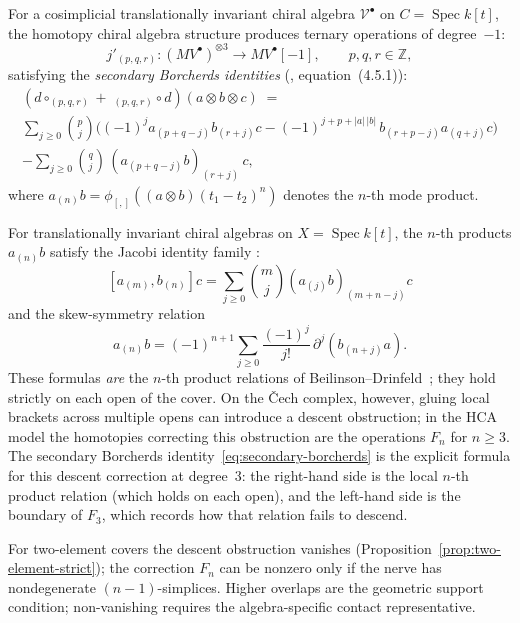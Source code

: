 \begin{definition}
\label{def:secondary-borcherds}
For a cosimplicial translationally invariant chiral algebra
$\mathcal{V}^\bullet$ on $C = \operatorname{Spec} k[t]$, the
homotopy chiral algebra structure produces ternary
operations of degree~$-1$:
\[
j'_{(p,q,r)}\colon
 (MV^\bullet)^{\otimes 3} \longrightarrow MV^\bullet[-1],
 \qquad p,q,r \in \mathbb{Z},
\]
satisfying the \emph{secondary Borcherds identities}
\textup{(\cite{MS24}, equation~(4.5.1))}:
\begin{multline}\label{eq:secondary-borcherds}
 (d \circ_{(p,q,r)} +\; {}_{(p,q,r)} \circ d)(a \otimes b \otimes c)
 \;=\\
 \sum_{j \geq 0}\binom{p}{j}\bigl(
 (-1)^j a_{(p+q-j)} b_{(r+j)} c
 - (-1)^{j+p+|a|\,|b|}\, b_{(r+p-j)} a_{(q+j)} c
 \bigr)\\
 - \sum_{j \geq 0}\binom{q}{j}\,
 (a_{(p+q-j)} b)_{(r+j)}\, c,
\end{multline}
where $a_{(n)}b = \phi_{[,]}((a \otimes b)(t_1-t_2)^n)$
denotes the $n$-th mode product.
\end{definition}

\begin{remark}
\label{rem:vertex-lie-jacobi-family}
For translationally invariant chiral algebras on
$X = \operatorname{Spec}k[t]$, the $n$-th products
$a_{(n)}b$ satisfy the Jacobi identity family
\cite{MS24}:
\begin{equation}\label{eq:vertex-jacobi-family}
[a_{(m)}, b_{(n)}]c
= \sum_{j \geq 0} \binom{m}{j}(a_{(j)}b)_{(m+n-j)}c
\end{equation}
and the skew-symmetry relation
\begin{equation}\label{eq:vertex-skew}
a_{(n)}b = (-1)^{n+1}\sum_{j \geq 0}
\frac{(-1)^j}{j!}\,\partial^j(b_{(n+j)}a).
\end{equation}
These formulas \emph{are} the $n$-th product relations of
Beilinson--Drinfeld~\cite{BD04}; they hold strictly on each open
of the cover. On the \v{C}ech complex, however, gluing local
brackets across multiple opens can introduce a descent obstruction;
in the HCA model the homotopies correcting this obstruction are the
operations $F_n$ for $n \geq 3$. The secondary Borcherds
identity~\eqref{eq:secondary-borcherds} is the explicit formula
for this descent correction at degree~$3$: the right-hand side is
the local $n$-th product relation (which holds on each open), and
the left-hand side is the boundary of $F_3$, which records how
that relation fails to descend.

For two-element covers the descent obstruction vanishes
(Proposition~\ref{prop:two-element-strict}); the correction $F_n$
can be nonzero only if the nerve has nondegenerate
$(n{-}1)$-simplices.  Higher overlaps are the geometric support
condition; non-vanishing requires the algebra-specific contact
representative.
\end{remark}


